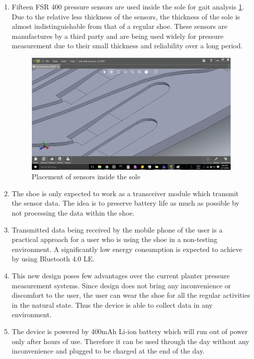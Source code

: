 \documentclass[a4paper]{report}
\begin{document}
	\begin{enumerate}
		\item
		 Fifteen FSR 400 pressure sensors are used inside the sole for gait analysis \ref{fig:sensor_grooves}. Due to the relative less thickness of the sensors, the thickness of the sole is almost indistinguishable from that of a regular shoe. These sensors are manufactures by a third party and are being used widely for pressure measurement due to their small thickness and reliability over a long period.
		 
		 \begin{figure}[H]
		 	\includegraphics[width = \linewidth]{sensor_grooves}
		 	\caption{Placement of sensors inside the sole}
		 	\label{fig:sensor_grooves}
		 \end{figure}
		
		\item
		The shoe is only expected to work as a transceiver module which transmit the sensor data. The idea is to preserve battery life as much as possible by not processing the data within the shoe.
		
		\item
		Transmitted data being received by the mobile phone of the user is a practical approach for a user who is using the shoe in a non-testing environment. A significantly low energy consumption is expected to achieve by using Bluetooth 4.0 LE.
		
		\item
		This new design poses few advantages over the current planter pressure measurement systems. Since design does not bring any inconvenience or discomfort to the user, the user can wear the shoe for all the regular activities in the natural state. Thus the device is able to collect data in any environment.
		
		\item
		The device is powered by 400mAh Li-ion battery which will run out of power only after hours of use. Therefore it can be used through the day without any inconvenience and plugged to be charged at the end of the day.
		

\end{enumerate}
\end{document}

